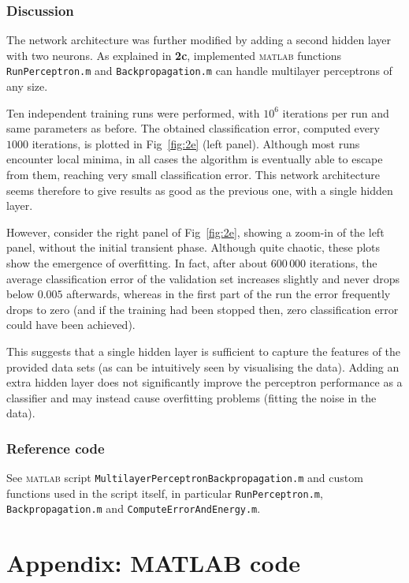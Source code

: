 \documentclass[12pt,titlepage]{article}
\begin{document}
\subsubsection*{Discussion}

The network architecture was further modified by adding a second hidden layer with two neurons. As explained in \textbf{2c}, implemented \textsc{matlab} functions \verb!RunPerceptron.m! and \verb!Backpropagation.m! can handle multilayer perceptrons of any size. 
 
Ten independent training runs were performed, with $10^6$ iterations per run and same parameters as before. The obtained classification error, computed every $1000$ iterations, is plotted in Fig~\ref{fig:2e} (left panel). Although most runs encounter local minima, in all cases the algorithm is eventually able to escape from them, reaching very small classification error. This network architecture seems therefore to give results as good as the previous one, with a single hidden layer.
 
However, consider the right panel of Fig~\ref{fig:2e}, showing a zoom-in of the left panel, without the initial transient phase. Although quite chaotic, these plots show the emergence of overfitting. In fact, after about $600\,000$ iterations, the average classification error of the validation set increases slightly and never drops below $0.005$ afterwards, whereas in the first part of the run the error frequently drops to zero (and if the training had been stopped then, zero classification error could have been achieved).

This suggests that a single hidden layer is sufficient to capture the features of the provided data sets (as can be intuitively seen by visualising the data). Adding an extra hidden layer does not significantly improve the perceptron performance as a classifier and may instead cause overfitting problems (fitting the noise in the data).

\subsubsection*{Reference code}
\vspace*{-0.2cm}
See \textsc{matlab} script \verb!MultilayerPerceptronBackpropagation.m! and custom functions used in the script itself, in particular \verb!RunPerceptron.m!, \verb!Backpropagation.m! and \verb!ComputeErrorAndEnergy.m!.

\clearpage


\appendix
\section*{Appendix: MATLAB code}
\end{document}
